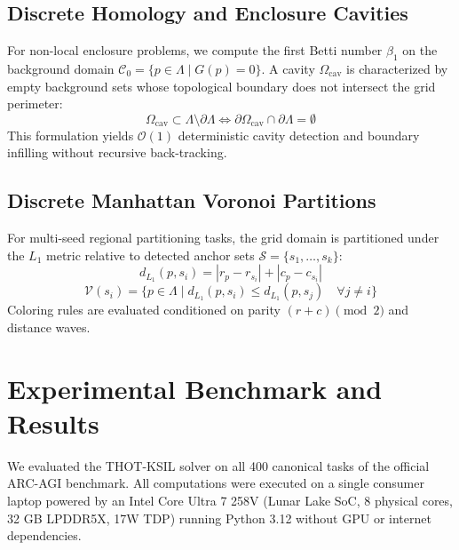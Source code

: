 \documentclass[11pt,a4paper]{article}
\begin{document}
\subsection{Discrete Homology and Enclosure Cavities}

For non-local enclosure problems, we compute the first Betti number $\beta_1$ on the background domain $\mathcal{C}_0 = \{ p \in \Lambda \mid G(p) = 0 \}$. A cavity $\Omega_{\text{cav}}$ is characterized by empty background sets whose topological boundary does not intersect the grid perimeter:
\begin{equation}
\Omega_{\text{cav}} \subset \Lambda \setminus \partial \Lambda \iff \partial \Omega_{\text{cav}} \cap \partial \Lambda = \emptyset
\end{equation}
This formulation yields $\mathcal{O}(1)$ deterministic cavity detection and boundary infilling without recursive back-tracking.

\subsection{Discrete Manhattan Voronoi Partitions}

For multi-seed regional partitioning tasks, the grid domain is partitioned under the $L_1$ metric relative to detected anchor sets $\mathcal{S} = \{ s_1, \dots, s_k \}$:
\begin{equation}
d_{L_1}(p, s_i) = |r_p - r_{s_i}| + |c_p - c_{s_i}|
\end{equation}
\begin{equation}
\mathcal{V}(s_i) = \{ p \in \Lambda \mid d_{L_1}(p, s_i) \le d_{L_1}(p, s_j) \quad \forall j \neq i \}
\end{equation}
Coloring rules are evaluated conditioned on parity $(r + c) \pmod 2$ and distance waves.

\section{Experimental Benchmark and Results}

We evaluated the THOT-KSIL solver on all 400 canonical tasks of the official ARC-AGI benchmark. All computations were executed on a single consumer laptop powered by an Intel Core Ultra 7 258V (Lunar Lake SoC, 8 physical cores, 32 GB LPDDR5X, 17W TDP) running Python 3.12 without GPU or internet dependencies.
\end{document}
